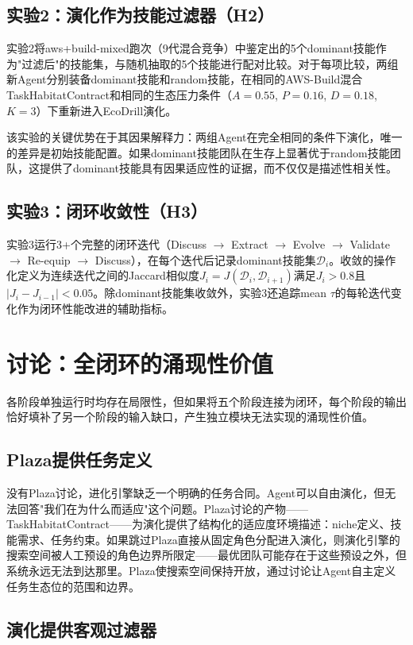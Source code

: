 \documentclass[12pt,a4paper]{ctexart}
\def\cD{\mathcal{D}}
\begin{document}
\subsection{实验2：演化作为技能过滤器（H2）}

实验2将aws+build-mixed跑次（9代混合竞争）中鉴定出的5个dominant技能作为"过滤后"的技能集，与随机抽取的5个技能进行配对比较。对于每项比较，两组新Agent分别装备dominant技能和random技能，在相同的AWS-Build混合TaskHabitatContract和相同的生态压力条件（$A=0.55$, $P=0.16$, $D=0.18$, $K=3$）下重新进入EcoDrill演化。

该实验的关键优势在于其因果解释力：两组Agent在完全相同的条件下演化，唯一的差异是初始技能配置。如果dominant技能团队在生存上显著优于random技能团队，这提供了dominant技能具有因果适应性的证据，而不仅仅是描述性相关性。

\subsection{实验3：闭环收敛性（H3）}

实验3运行3+个完整的闭环迭代（Discuss $\to$ Extract $\to$ Evolve $\to$ Validate $\to$ Re-equip $\to$ Discuss），在每个迭代后记录dominant技能集$\cD_i$。收敛的操作化定义为连续迭代之间的Jaccard相似度$J_i = J(\cD_i, \cD_{i+1})$满足$J_i > 0.8$且$|J_i - J_{i-1}| < 0.05$。除dominant技能集收敛外，实验3还追踪mean $\tau$的每轮迭代变化作为闭环性能改进的辅助指标。

\section{讨论：全闭环的涌现性价值}

各阶段单独运行时均存在局限性，但如果将五个阶段连接为闭环，每个阶段的输出恰好填补了另一个阶段的输入缺口，产生独立模块无法实现的涌现性价值。

\subsection{Plaza提供任务定义}

没有Plaza讨论，进化引擎缺乏一个明确的任务合同。Agent可以自由演化，但无法回答"我们在为什么而适应"这个问题。Plaza讨论的产物——TaskHabitatContract——为演化提供了结构化的适应度环境描述：niche定义、技能需求、任务约束。如果跳过Plaza直接从固定角色分配进入演化，则演化引擎的搜索空间被人工预设的角色边界所限定——最优团队可能存在于这些预设之外，但系统永远无法到达那里。Plaza使搜索空间保持开放，通过讨论让Agent自主定义任务生态位的范围和边界。

\subsection{演化提供客观过滤器}
\end{document}
